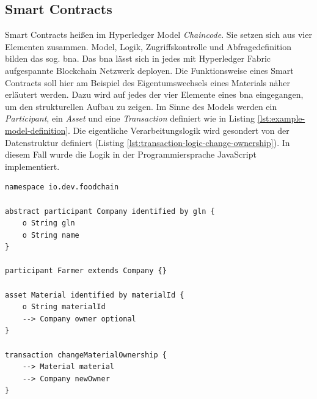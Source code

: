 \subsection{Smart Contracts}
Smart Contracts heißen im Hyperledger Model \textit{Chaincode}. Sie setzen sich aus vier Elementen zusammen. Model, Logik, Zugriffskontrolle und Abfragedefinition bilden das sog. \acf{bna}. Das \ac{bna} lässt sich in jedes mit Hyperledger Fabric aufgespannte Blockchain Netzwerk deployen. Die Funktionsweise eines Smart Contracts soll hier am Beispiel des Eigentumswechsels eines Materials näher erläutert werden. Dazu wird auf jedes der vier Elemente eines \ac{bna} eingegangen, um den strukturellen Aufbau zu zeigen. Im Sinne des Models werden ein \textit{Participant}, ein \textit{Asset} und eine \textit{Transaction} definiert wie in Listing \ref{lst:example-model-definition}. Die eigentliche Verarbeitungslogik wird gesondert von der Datenstruktur definiert (Listing \ref{lst:transaction-logic-change-ownership}). In diesem Fall wurde die Logik in der Programmiersprache JavaScript implementiert.

\begin{lstlisting}[caption={Model Example Definition},label=lst:example-model-definition]
namespace io.dev.foodchain

abstract participant Company identified by gln {
    o String gln
    o String name
}

participant Farmer extends Company {}

asset Material identified by materialId {
    o String materialId
    --> Company owner optional
}

transaction changeMaterialOwnership {
    --> Material material
    --> Company newOwner
}
\end{lstlisting}

